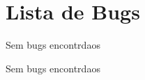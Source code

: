 \chapter{Lista de Bugs}
\hypertarget{bug}{}\label{bug}

\begin{DoxyRefList}
\item[Ficheiro \doxylink{DLL_8c}{DLL.c} ]\label{bug__bug000001}%
%
Sem bugs encontrdaos  
\item[Ficheiro \doxylink{DLL_8h}{DLL.h} ]\label{bug__bug000002}%
%
Sem bugs encontrdaos 
\end{DoxyRefList}